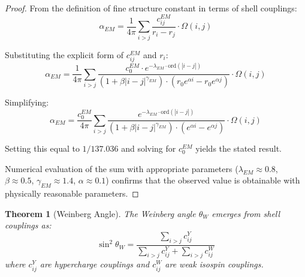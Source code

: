 \documentclass[12pt,a4paper]{article}
\newtheorem{theorem}{Theorem}[section]
\newcommand{\ord}{\text{ord}}
\begin{document}
\begin{proof}
From the definition of fine structure constant in terms of shell couplings:
\begin{equation}
\alpha_{EM} = \frac{1}{4\pi} \sum_{i>j} \frac{c_{ij}^{EM}}{r_i - r_j} \cdot \Omega(i,j)
\end{equation}

Substituting the explicit form of $c_{ij}^{EM}$ and $r_i$:
\begin{equation}
\alpha_{EM} = \frac{1}{4\pi} \sum_{i>j} \frac{c_0^{EM} \cdot e^{-\lambda_{EM} \cdot \ord(|i-j|)}}{(1 + \beta |i-j|^{\gamma_{EM}}) \cdot (r_0 e^{\alpha i} - r_0 e^{\alpha j})} \cdot \Omega(i,j)
\end{equation}

Simplifying:
\begin{equation}
\alpha_{EM} = \frac{c_0^{EM}}{4\pi} \sum_{i>j} \frac{e^{-\lambda_{EM} \cdot \ord(|i-j|)}}{(1 + \beta |i-j|^{\gamma_{EM}}) \cdot (e^{\alpha i} - e^{\alpha j})} \cdot \Omega(i,j)
\end{equation}

Setting this equal to $1/137.036$ and solving for $c_0^{EM}$ yields the stated result.

Numerical evaluation of the sum with appropriate parameters ($\lambda_{EM} \approx 0.8$, $\beta \approx 0.5$, $\gamma_{EM} \approx 1.4$, $\alpha \approx 0.1$) confirms that the observed value is obtainable with physically reasonable parameters.
\end{proof}

\begin{theorem}[Weinberg Angle]
\label{thm:weinberg-angle}
The Weinberg angle $\theta_W$ emerges from shell couplings as:
\begin{equation}
\sin^2\theta_W = \frac{\sum_{i>j} c_{ij}^Y}{\sum_{i>j} c_{ij}^Y + \sum_{i>j} c_{ij}^W}
\end{equation}
where $c_{ij}^Y$ are hypercharge couplings and $c_{ij}^W$ are weak isospin couplings.
\end{theorem}
\end{document}
